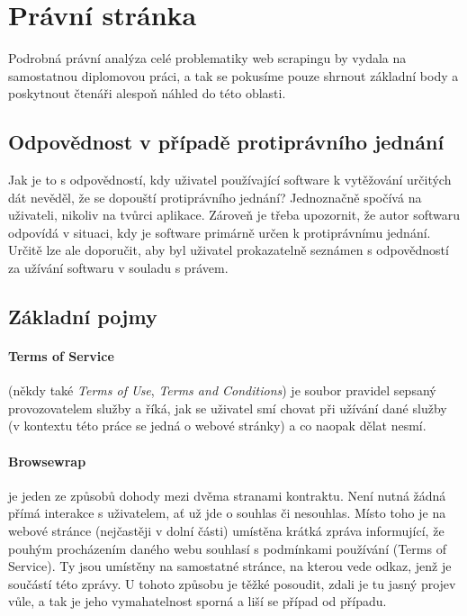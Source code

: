 \documentclass[thesis=B,czech]{FITthesis}[2012/06/26]
\begin{document}
\section{Právní stránka}
Podrobná právní analýza celé problematiky web scrapingu by vydala na samostatnou diplomovou práci, a tak se pokusíme pouze shrnout základní body a poskytnout čtenáři alespoň náhled do této oblasti.

\subsection{Odpovědnost v případě protiprávního jednání}
Jak je to s odpovědností, kdy uživatel používající software k vytěžování určitých dát nevěděl, že se dopouští protiprávního jednání? Jednoznačně spočívá na uživateli, nikoliv na tvůrci aplikace. Zároveň je třeba upozornit, že autor softwaru odpovídá v situaci, kdy je software primárně určen k protiprávnímu jednání. Určitě lze ale doporučit, aby byl uživatel prokazatelně seznámen s odpovědností za užívání softwaru v souladu s právem.\cite{rozhovor}

\subsection{Základní pojmy}
\paragraph{Terms of Service} (někdy také \textit{Terms of Use}, \textit{Terms and Conditions}) je soubor pravidel sepsaný provozovatelem služby a říká, jak se uživatel smí chovat při užívání dané služby (v kontextu této práce se jedná o webové stránky) a co naopak dělat nesmí.

\paragraph{Browsewrap} je jeden ze způsobů dohody mezi dvěma stranami kontraktu. Není nutná žádná přímá interakce s uživatelem, ať už jde o souhlas či nesouhlas. Místo toho je na webové stránce (nejčastěji v dolní části) umístěna krátká zpráva informující, že pouhým procházením daného webu souhlasí s podmínkami používání (Terms of Service). Ty jsou umístěny na samostatné stránce, na kterou vede odkaz, jenž je součástí této zprávy. U tohoto způsobu je těžké posoudit, zdali je tu jasný projev vůle, a tak je jeho vymahatelnost sporná a liší se případ od případu.\cite{browse_wrap}
\end{document}
